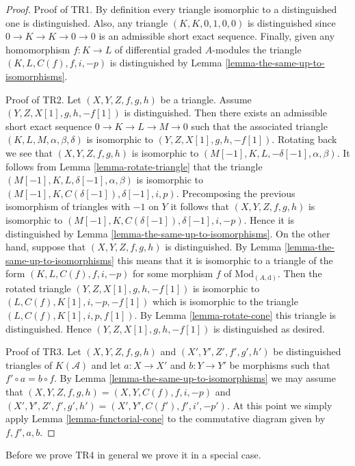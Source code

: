 \documentclass{stacks-project}
\theoremstyle{plain}
\theoremstyle{definition}
\theoremstyle{remark}
\numberwithin{equation}{subsection}
\begin{document}
\begin{proof}
Proof of TR1. By definition every triangle isomorphic to a distinguished
one is distinguished. Also, any triangle $(K, K, 0, 1, 0, 0)$
is distinguished since $0 \to K \to K \to 0 \to 0$ is
an admissible short exact sequence. Finally, given any homomorphism
$f : K \to L$ of differential graded $A$-modules the triangle
$(K, L, C(f), f, i, -p)$ is distinguished by
Lemma \ref{lemma-the-same-up-to-isomorphisms}.

\medskip\noindent
Proof of TR2. Let $(X, Y, Z, f, g, h)$ be a triangle.
Assume $(Y, Z, X[1], g, h, -f[1])$ is distinguished.
Then there exists an admissible short exact sequence
$0 \to K \to L \to M \to 0$ such that the associated
triangle $(K, L, M, \alpha, \beta, \delta)$
is isomorphic to $(Y, Z, X[1], g, h, -f[1])$. Rotating back we see
that $(X, Y, Z, f, g, h)$ is isomorphic to
$(M[-1], K, L, -\delta[-1], \alpha, \beta)$.
It follows from Lemma \ref{lemma-rotate-triangle} that the triangle
$(M[-1], K, L, \delta[-1], \alpha, \beta)$
is isomorphic to
$(M[-1], K, C(\delta[-1]), \delta[-1], i, p)$.
Precomposing the previous isomorphism of triangles with $-1$ on $Y$
it follows that $(X, Y, Z, f, g, h)$ is isomorphic to
$(M[-1], K, C(\delta[-1]), \delta[-1], i, -p)$.
Hence it is distinguished by
Lemma \ref{lemma-the-same-up-to-isomorphisms}.
On the other hand, suppose that $(X, Y, Z, f, g, h)$ is distinguished.
By Lemma \ref{lemma-the-same-up-to-isomorphisms} this means that it is
isomorphic to a triangle of the form
$(K, L, C(f), f, i, -p)$ for some morphism $f$ of
$\text{Mod}_{(A, \text{d})}$. Then the rotated triangle
$(Y, Z, X[1], g, h, -f[1])$ is
isomorphic to $(L, C(f), K[1], i, -p, -f[1])$ which is
isomorphic to the triangle
$(L, C(f), K[1], i, p, f[1])$.
By Lemma \ref{lemma-rotate-cone} this triangle is distinguished.
Hence $(Y, Z, X[1], g, h, -f[1])$ is distinguished as desired.

\medskip\noindent
Proof of TR3. Let $(X, Y, Z, f, g, h)$ and $(X', Y', Z', f', g', h')$
be distinguished triangles of $K(\mathcal{A})$ and let $a : X \to X'$
and $b : Y \to Y'$ be morphisms such that $f' \circ a = b \circ f$. By
Lemma \ref{lemma-the-same-up-to-isomorphisms} we may assume that
$(X, Y, Z, f, g, h) = (X, Y, C(f), f, i, -p)$ and
$(X', Y', Z', f', g', h') = (X', Y', C(f'), f', i', -p')$.
At this point we simply apply Lemma \ref{lemma-functorial-cone}
to the commutative diagram given by $f, f', a, b$.
\end{proof}

\noindent
Before we prove TR4 in general we prove it in a special case.
\end{document}
